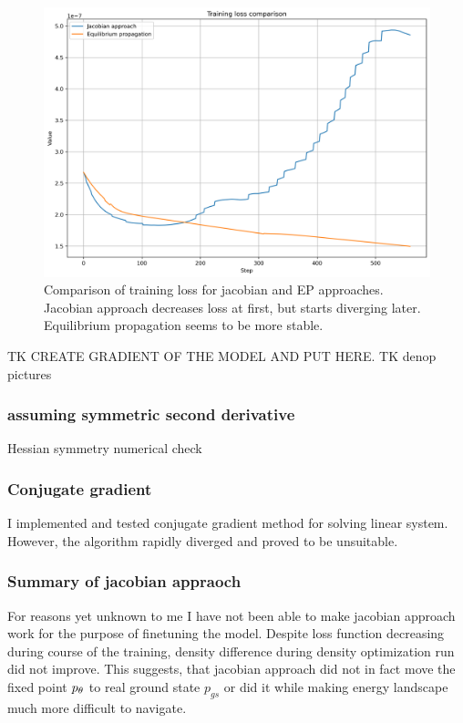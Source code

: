 \documentclass[a4paper,10pt]{report}
\begin{document}
\begin{figure}[h!]
 \centering
 \includegraphics[scale=0.5]{images/loss_comparison.png}
 \caption{Comparison of training loss for jacobian and EP approaches. Jacobian approach decreases loss at first, but starts diverging later. Equilibrium propagation seems to be more stable.}
 \label{fig:jac-eqprop-loss}
\end{figure}



 TK CREATE GRADIENT OF THE MODEL AND PUT HERE.
TK denop pictures
\subsubsection{assuming symmetric second derivative}

Hessian symmetry numerical check

\subsubsection{Conjugate gradient}
I implemented and tested conjugate gradient method for solving linear system. However, the algorithm rapidly diverged and proved to be unsuitable.
\subsubsection{Summary of jacobian appraoch}

 For reasons yet unknown to me I have not been able to make jacobian approach work for the purpose of finetuning the model. Despite loss function decreasing during course of the training, density difference during density optimization run did not improve. This suggests, that jacobian approach did not in fact move the fixed point $p_\theta$ to real ground state $p_{gs}$ or did it while making energy landscape much more difficult to navigate.
\end{document}
